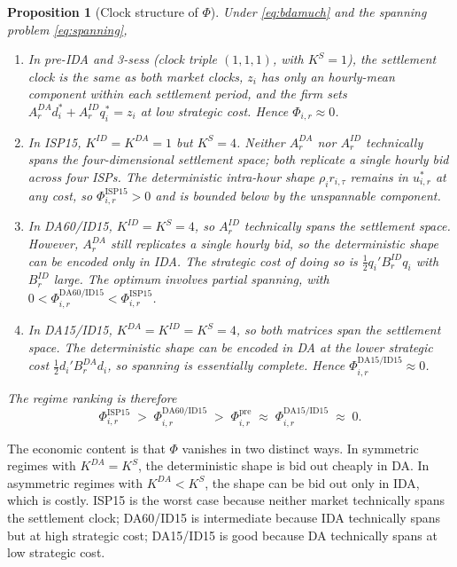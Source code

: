 \documentclass[11pt]{article}
\newtheorem{proposition}{Proposition}
\begin{document}
\begin{proposition}[Clock structure of $\Phi$]
\label{prop:phi}
Under \eqref{eq:bdamuch} and the spanning problem \eqref{eq:spanning},
\begin{enumerate}[label=(\roman*)]
\item In pre-IDA and 3-sess (clock triple $(1,1,1)$, with $K^{S} = 1$), the settlement clock is the same as both market clocks, $z_{i}$ has only an hourly-mean component within each settlement period, and the firm sets $A^{DA}_r d^{*}_{i} + A^{ID}_r q^{*}_{i} = z_{i}$ at low strategic cost. Hence $\Phi_{i,r} \approx 0$.
\item In ISP15, $K^{ID} = K^{DA} = 1$ but $K^{S} = 4$. Neither $A^{DA}_r$ nor $A^{ID}_r$ technically spans the four-dimensional settlement space; both replicate a single hourly bid across four ISPs. The deterministic intra-hour shape $\rho_{i} r_{i,\tau}$ remains in $u^{*}_{i,r}$ at any cost, so $\Phi^{\text{ISP15}}_{i,r} > 0$ and is bounded below by the unspannable component.
\item In DA60/ID15, $K^{ID} = K^{S} = 4$, so $A^{ID}_r$ technically spans the settlement space. However, $A^{DA}_r$ still replicates a single hourly bid, so the deterministic shape can be encoded only in IDA. The strategic cost of doing so is $\tfrac{1}{2} q_{i}' B^{ID}_r q_{i}$ with $B^{ID}_r$ large. The optimum involves \emph{partial} spanning, with $0 < \Phi^{\text{DA60/ID15}}_{i,r} < \Phi^{\text{ISP15}}_{i,r}$.
\item In DA15/ID15, $K^{DA} = K^{ID} = K^{S} = 4$, so both matrices span the settlement space. The deterministic shape can be encoded in DA at the lower strategic cost $\tfrac{1}{2} d_{i}' B^{DA}_r d_{i}$, so spanning is essentially complete. Hence $\Phi^{\text{DA15/ID15}}_{i,r} \approx 0$.
\end{enumerate}
The regime ranking is therefore
\[
\Phi^{\text{ISP15}}_{i,r} \;>\; \Phi^{\text{DA60/ID15}}_{i,r} \;>\; \Phi^{\text{pre}}_{i,r} \;\approx\; \Phi^{\text{DA15/ID15}}_{i,r} \;\approx\; 0.
\]
\end{proposition}

The economic content is that $\Phi$ vanishes in two distinct ways. In symmetric regimes with $K^{DA} = K^{S}$, the deterministic shape is bid out cheaply in DA. In asymmetric regimes with $K^{DA} < K^{S}$, the shape can be bid out only in IDA, which is costly. ISP15 is the worst case because neither market technically spans the settlement clock; DA60/ID15 is intermediate because IDA technically spans but at high strategic cost; DA15/ID15 is good because DA technically spans at low strategic cost.
\end{document}
